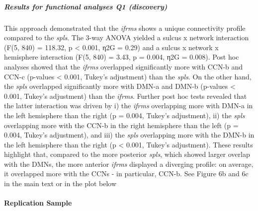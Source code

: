 \documentclass[
]{article}
\begin{document}
\hypertarget{results-for-functional-analyses-q1-discovery}{%
\subparagraph{Results for functional analyses Q1
(discovery)}\label{results-for-functional-analyses-q1-discovery}}

This approach demonstrated that the \emph{ifrms} shows a unique
connectivity profile compared to the \emph{spls}. The 3-way ANOVA
yielded a sulcus x network interaction (F(5, 840) = 118.32, p
\textless{} 0.001, η2G = 0.29) and a sulcus x network x hemisphere
interaction (F(5, 840) = 3.43, p = 0.004, η2G = 0.008). Post hoc
analyses showed that the \emph{ifrms} overlapped significantly more with
CCN-b and CCN-c (p-values \textless{} 0.001, Tukey's adjustment) than
the \emph{spls}. On the other hand, the \emph{spls} overlapped
significantly more with DMN-a and DMN-b (p-values \textless{} 0.001,
Tukey's adjustment) than the \emph{ifrms}. Further post hoc tests
revealed that the latter interaction was driven by i) the \emph{ifrms}
overlapping more with DMN-a in the left hemisphere than the right (p =
0.004, Tukey's adjustment), ii) the \emph{spls} overlapping more with
the CCN-b in the right hemisphere than the left (p = 0.004, Tukey's
adjustment), and iii) the \emph{spls} overlapping more with the DMN-b in
the left hemisphere than the right (p \textless{} 0.001, Tukey's
adjustment). These results highlight that, compared to the more
posterior \emph{spls}, which showed larger overlap with the DMNs, the
more anterior \emph{ifrms} displayed a diverging profile: on average, it
overlapped more with the CCNs - in particular, CCN-b. See Figure 6b and
6c in the main text or in the plot below

\hypertarget{replication-sample-3}{%
\paragraph{Replication Sample}\label{replication-sample-3}}
\end{document}

